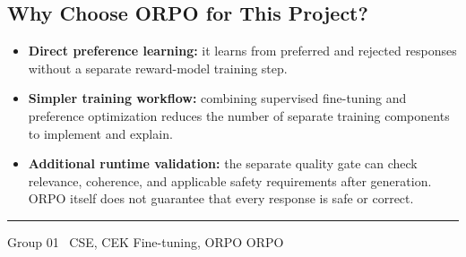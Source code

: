 \documentclass{article}
\begin{document}
\subsection{Why Choose ORPO for This Project?}
\begin{itemize}
    \item \textbf{Direct preference learning:} it learns from preferred and rejected responses without a separate reward-model training step.
    \item \textbf{Simpler training workflow:} combining supervised fine-tuning and preference optimization reduces the number of separate training components to implement and explain.
    \item \textbf{Additional runtime validation:} the separate quality gate can check relevance, coherence, and applicable safety requirements after generation. ORPO itself does not guarantee that every response is safe or correct.
\end{itemize}

\vfill
\footnotesize
\noindent\rule{\textwidth}{0.4pt}
\begin{center}
Group 01 \textbullet\ CSE, CEK \hfill Fine-tuning, ORPO \hfill ORPO
\end{center}
\end{document}

